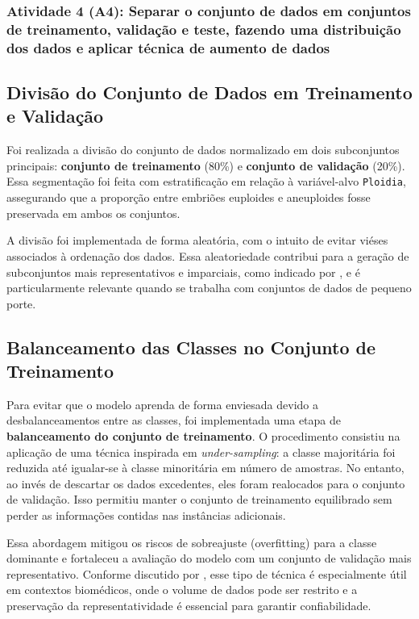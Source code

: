 \subsubsection{Atividade 4 (A4): Separar o conjunto de dados em conjuntos de treinamento, validação e teste, fazendo uma distribuição dos dados e aplicar técnica de aumento de dados}

\subsection*{Divisão do Conjunto de Dados em Treinamento e Validação}

Foi realizada a divisão do conjunto de dados normalizado em dois subconjuntos principais: \textbf{conjunto de treinamento} (80\%) e \textbf{conjunto de validação} (20\%). Essa segmentação foi feita com estratificação em relação à variável-alvo \texttt{Ploidia}, assegurando que a proporção entre embriões euploides e aneuploides fosse preservada em ambos os conjuntos.

A divisão foi implementada de forma aleatória, com o intuito de evitar viéses associados à ordenação dos dados. Essa aleatoriedade contribui para a geração de subconjuntos mais representativos e imparciais, como indicado por , e é particularmente relevante quando se trabalha com conjuntos de dados de pequeno porte.

\subsection*{Balanceamento das Classes no Conjunto de Treinamento}
Para evitar que o modelo aprenda de forma enviesada devido a desbalanceamentos entre as classes, foi implementada uma etapa de \textbf{balanceamento do conjunto de treinamento}. O procedimento consistiu na aplicação de uma técnica inspirada em \textit{under-sampling}: a classe majoritária foi reduzida até igualar-se à classe minoritária em número de amostras. No entanto, ao invés de descartar os dados excedentes, eles foram realocados para o conjunto de validação. Isso permitiu manter o conjunto de treinamento equilibrado sem perder as informações contidas nas instâncias adicionais.

Essa abordagem mitigou os riscos de sobreajuste (overfitting) para a classe dominante e fortaleceu a avaliação do modelo com um conjunto de validação mais representativo. Conforme discutido por , esse tipo de técnica é especialmente útil em contextos biomédicos, onde o volume de dados pode ser restrito e a preservação da representatividade é essencial para garantir confiabilidade. 

